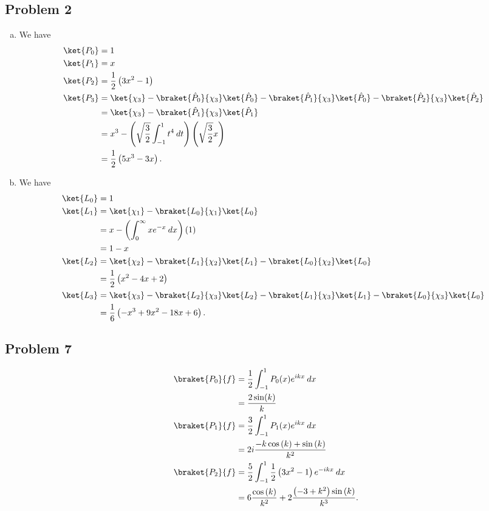 \documentclass[10pt]{mypackage}
\begin{document}
\subsection{Problem 2}%
\begin{enumerate}[(a)]
  \item We have
    \begin{align*}
      \ket{P_0} &= 1\\
      \ket{P_1} &= x\\
      \ket{P_2} &= \frac{1}{2} \left(3x^2 - 1\right)\\
      \ket{P_3} &= \ket{\chi_3} - \braket{\hat{P}_0}{\chi_3}\ket{\hat{P}_0} - \braket{\hat{P}_1}{\chi_3}\ket{\hat{P}_0}- \braket{\hat{P}_2}{\chi_3}\ket{\hat{P}_2}\\
                &= \ket{\chi_3} - \braket{\hat{P}_1}{\chi_3}\ket{\hat{P}_1}\\
                &= x^3 - \left(\sqrt{\frac{3}{2}} \int_{-1}^{1} t^4\:dt\right)\left(\sqrt{\frac{3}{2}}x\right)\\
                &= \frac{1}{2}\left(5x^3 - 3x\right).
    \end{align*}
  \item We have
    \begin{align*}
      \ket{L_0} &= 1\\
      \ket{L_1} &= \ket{\chi_1} - \braket{L_0}{\chi_1}\ket{L_0}\\
                &= x - \left(\int_{0}^{\infty} xe^{-x}\:dx\right)\left(1\right)\\
                &= 1-x\\
      \ket{L_2} &= \ket{\chi_2} - \braket{L_1}{\chi_2}\ket{L_1} - \braket{L_0}{\chi_2}\ket{L_0}\\
                &= \frac{1}{2}\left(x^2 - 4x + 2\right)\\
      \ket{L_3} &= \ket{\chi_3} - \braket{L_2}{\chi_3}\ket{L_2} - \braket{L_1}{\chi_3}\ket{L_1} - \braket{L_0}{\chi_3}\ket{L_0}\\
                &= \frac{1}{6}\left(-x^3 + 9x^2 -18x + 6\right).
    \end{align*}
\end{enumerate}
\subsection{Problem 7}%
\begin{align*}
  \braket{P_0}{f} &= \frac{1}{2}\int_{-1}^{1} P_0(x)e^{ikx}\:dx\\
                  &= \frac{2\sin(k)}{k}\\
  \braket{P_1}{f} &= \frac{3}{2}\int_{-1}^{1} P_1(x)e^{ikx}\:dx\\
                  &= 2i\frac{-k\cos\left(k\right) + \sin\left(k\right)}{k^2}\\
  \braket{P_2}{f} &= \frac{5}{2}\int_{-1}^{1} \frac{1}{2}\left(3x^2 - 1\right)e^{-ikx}\:dx\\
                  &= 6\frac{\cos\left(k\right)}{k^2} + 2\frac{\left(-3 + k^2\right)\sin\left(k\right)}{k^3}.
\end{align*}
\end{document}
